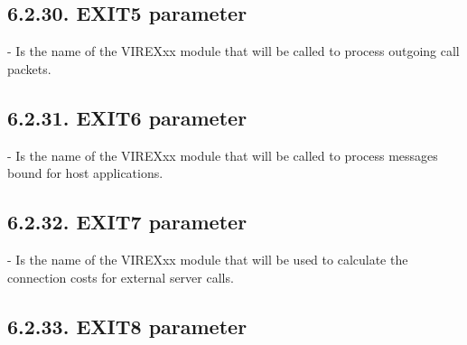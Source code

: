 \documentclass[letterpaper,10pt,english]{sphinxmanual}
\begin{document}
\subsection{6.2.30. EXIT5 parameter}
\label{\detokenize{Installation_Guide:exit5-parameter}}
\begin{sphinxVerbatim}[commandchars=\\\{\}]
 
\end{sphinxVerbatim}

 - Is the name of the VIREXxx module that will be called to process outgoing call packets.


\subsection{6.2.31. EXIT6 parameter}
\label{\detokenize{Installation_Guide:exit6-parameter}}
\begin{sphinxVerbatim}[commandchars=\\\{\}]
 
\end{sphinxVerbatim}

 - Is the name of the VIREXxx module that will be called to process messages bound for host applications.


\subsection{6.2.32. EXIT7 parameter}
\label{\detokenize{Installation_Guide:exit7-parameter}}
\begin{sphinxVerbatim}[commandchars=\\\{\}]
 
\end{sphinxVerbatim}

 - Is the name of the VIREXxx module that will be used to calculate the connection costs for external server calls.


\subsection{6.2.33. EXIT8 parameter}
\label{\detokenize{Installation_Guide:exit8-parameter}}
\begin{sphinxVerbatim}[commandchars=\\\{\}]
 
\end{sphinxVerbatim}
\end{document}
